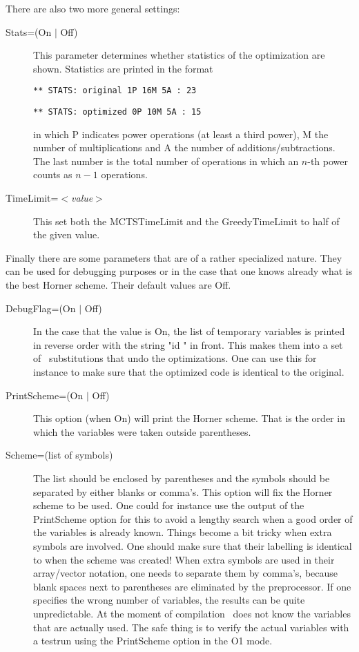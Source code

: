 There are also two more general settings:
\begin{description}
\item[Stats=(On $|$ Off)] This parameter determines whether statistics
  of the optimization are shown. Statistics are printed in the format

{\tt *** STATS: original  1P 16M 5A : 23}

{\tt *** STATS: optimized 0P 10M 5A : 15}

in which P indicates power operations (at least a third power), M the 
number of multiplications and A the number of additions/subtractions. The 
last number is the total number of operations in which an $n$-th power counts 
as $n-1$ operations.
\item[TimeLimit=$<$\emph{value}$>$] This set both the MCTSTimeLimit
  and the GreedyTimeLimit to half of the given value.
\end{description}

Finally there are some parameters that are of a rather specialized nature. 
They can be used for debugging purposes or in the case 
that one knows already what is the best Horner scheme. Their default values 
are Off.

\begin{description}
\item[DebugFlag=(On $|$ Off)] \label{optimdebugflag}
In the case that the value is On, the list of temporary variables is 
printed in reverse order with the string "id " in front. This makes 
them into a set of \FORM\ substitutions that undo the optimizations. One 
can use this for instance to make sure that the optimized code is identical 
to the original.
\item[PrintScheme=(On $|$ Off)]
This option (when On) will print the Horner scheme. That is the order in 
which the variables were taken outside parentheses.
\item[Scheme=(list of symbols)] The list should be enclosed by parentheses 
and the symbols should be separated by either blanks or comma's. This 
option will fix the Horner scheme to be used. One 
could for instance use the output of the PrintScheme option for this to 
avoid a lengthy search when a good order of the variables is already known. 
Things become a bit tricky when extra symbols are involved. One should make 
sure that their labelling is identical to when the scheme was created! When 
extra symbols are used in their array/vector notation, one needs to 
separate them by comma's, because blank spaces next to parentheses are 
eliminated by the preprocessor. If one specifies the wrong number of 
variables, the results can be quite unpredictable. At the moment of 
compilation \FORM\ does not know the variables that are actually used. The 
safe thing is to verify the actual variables with a testrun using the 
PrintScheme option in the O1 mode.
\end{description}

